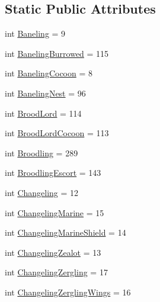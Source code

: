 \subsection*{Static Public Attributes}
\begin{DoxyCompactItemize}
\item 
int \mbox{\hyperlink{classpysc2_1_1lib_1_1units_1_1_zerg_ade29bf7d493896c18340d2404263cba8}{Baneling}} = 9
\item 
int \mbox{\hyperlink{classpysc2_1_1lib_1_1units_1_1_zerg_a5bc5040e0e38a307aa03dc4f42403b60}{Baneling\+Burrowed}} = 115
\item 
int \mbox{\hyperlink{classpysc2_1_1lib_1_1units_1_1_zerg_a65215b4281bd6b0d294588c91198e140}{Baneling\+Cocoon}} = 8
\item 
int \mbox{\hyperlink{classpysc2_1_1lib_1_1units_1_1_zerg_aedbf18a49ca56273664dba900ac6ff1d}{Baneling\+Nest}} = 96
\item 
int \mbox{\hyperlink{classpysc2_1_1lib_1_1units_1_1_zerg_af64a92a3d881ca581a1a58f92b581d2f}{Brood\+Lord}} = 114
\item 
int \mbox{\hyperlink{classpysc2_1_1lib_1_1units_1_1_zerg_a257b35e7f31a31f7b48bd1348ca673f0}{Brood\+Lord\+Cocoon}} = 113
\item 
int \mbox{\hyperlink{classpysc2_1_1lib_1_1units_1_1_zerg_a0bec4f6f0431875c8cf0f229344cf474}{Broodling}} = 289
\item 
int \mbox{\hyperlink{classpysc2_1_1lib_1_1units_1_1_zerg_a0b418c371cf6fcb3bf38b46a4aa3e779}{Broodling\+Escort}} = 143
\item 
int \mbox{\hyperlink{classpysc2_1_1lib_1_1units_1_1_zerg_a80d8716ba9005c72e94e22eb766111be}{Changeling}} = 12
\item 
int \mbox{\hyperlink{classpysc2_1_1lib_1_1units_1_1_zerg_a6bc8c66b0903f6e0cc0369e1c47bd1b3}{Changeling\+Marine}} = 15
\item 
int \mbox{\hyperlink{classpysc2_1_1lib_1_1units_1_1_zerg_a81f785416770e6a66198480dc13f01d6}{Changeling\+Marine\+Shield}} = 14
\item 
int \mbox{\hyperlink{classpysc2_1_1lib_1_1units_1_1_zerg_ac97d66e95818dd95a8265c6be2708f80}{Changeling\+Zealot}} = 13
\item 
int \mbox{\hyperlink{classpysc2_1_1lib_1_1units_1_1_zerg_a6e811f0258de29e2dfee2912ca5f0f96}{Changeling\+Zergling}} = 17
\item 
int \mbox{\hyperlink{classpysc2_1_1lib_1_1units_1_1_zerg_af74516c6118b3c93e1d1974dfab06d4a}{Changeling\+Zergling\+Wings}} = 16
\item 

\end{DoxyCompactItemize}
